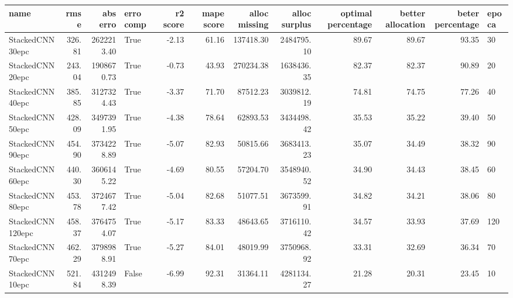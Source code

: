 \begin{tabular}{lrrlrrrrrrrl}
\toprule
name & rmse & abs erro & erro comp & r2 score & mape score & alloc missing & alloc surplus & optimal percentage & better allocation & beter percentage & epoca \\
\midrule
StackedCNN30epc & 326.81 & 2622213.40 & True & -2.13 & 61.16 & 137418.30 & 2484795.10 & 89.67 & 89.67 & 93.35 & 30 \\
StackedCNN20epc & 243.04 & 1908670.73 & True & -0.73 & 43.93 & 270234.38 & 1638436.35 & 82.37 & 82.37 & 90.89 & 20 \\
StackedCNN40epc & 385.85 & 3127324.43 & True & -3.37 & 71.70 & 87512.23 & 3039812.19 & 74.81 & 74.75 & 77.26 & 40 \\
StackedCNN50epc & 428.09 & 3497391.95 & True & -4.38 & 78.64 & 62893.53 & 3434498.42 & 35.53 & 35.22 & 39.40 & 50 \\
StackedCNN90epc & 454.90 & 3734228.89 & True & -5.07 & 82.93 & 50815.66 & 3683413.23 & 35.07 & 34.49 & 38.32 & 90 \\
StackedCNN60epc & 440.30 & 3606145.22 & True & -4.69 & 80.55 & 57204.70 & 3548940.52 & 34.90 & 34.43 & 38.45 & 60 \\
StackedCNN80epc & 453.78 & 3724677.42 & True & -5.04 & 82.68 & 51077.51 & 3673599.91 & 34.82 & 34.21 & 38.06 & 80 \\
StackedCNN120epc & 458.37 & 3764754.07 & True & -5.17 & 83.33 & 48643.65 & 3716110.42 & 34.57 & 33.93 & 37.69 & 120 \\
StackedCNN70epc & 462.29 & 3798988.91 & True & -5.27 & 84.01 & 48019.99 & 3750968.92 & 33.31 & 32.69 & 36.34 & 70 \\
StackedCNN10epc & 521.84 & 4312498.39 & False & -6.99 & 92.31 & 31364.11 & 4281134.27 & 21.28 & 20.31 & 23.45 & 10 \\
\bottomrule
\end{tabular}
